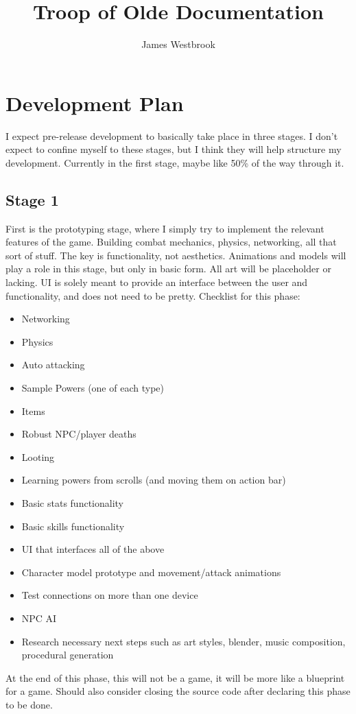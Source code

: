 \documentclass{article}
\title{Troop of Olde Documentation}
\author{James Westbrook}
\begin{document}
\maketitle

\tableofcontents

\pagebreak

\section{Development Plan}
I expect pre-release development to basically take place in three stages.
I don't expect to confine
myself to these stages, but I think they will help structure my development. Currently
in the first stage, maybe like 50\% of the way through it.

\subsection{Stage 1}
First is the prototyping stage, where I simply try to implement the relevant features
of the game. Building combat mechanics, physics, networking, all that sort of stuff.
The key is functionality, not aesthetics. Animations and models will play a role in this stage,
but only in basic form. All art will be placeholder or lacking. UI is solely meant to provide an
interface between the user and functionality, and does not need to be pretty.
Checklist for this phase:
\begin{itemize}
    \item Networking
    \item Physics
    \item Auto attacking
    \item Sample Powers (one of each type)
    \item Items
    \item Robust NPC/player deaths
    \item Looting
    \item Learning powers from scrolls (and moving them on action bar)
    \item Basic stats functionality
    \item Basic skills functionality
    \item UI that interfaces all of the above
    \item Character model prototype and movement/attack animations
    \item Test connections on more than one device
    \item NPC AI
    \item Research necessary next steps such as art styles, blender,
    music composition, procedural generation
\end{itemize}
At the end of this phase, this will not be a game, it will be more like a blueprint for a game.
Should also consider closing the source code after declaring this phase to be done.
\end{document}
